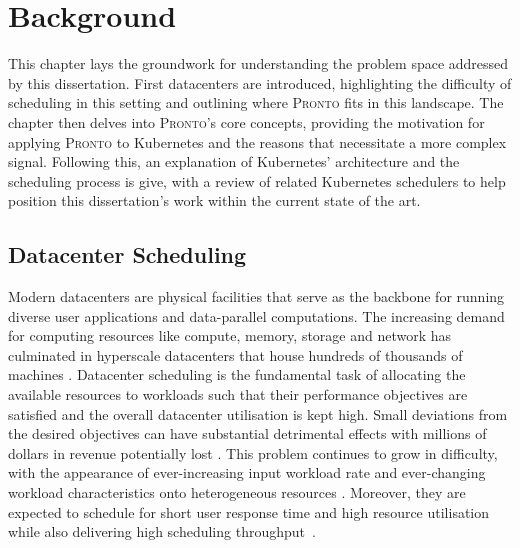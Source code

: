 \chapter{Background}

%
%
This chapter lays the groundwork for understanding the problem space addressed
by this dissertation. First datacenters are introduced, highlighting the
difficulty of scheduling in this setting and outlining where \textsc{Pronto}
fits in this landscape. The chapter then delves into \textsc{Pronto}'s core
concepts, providing the motivation for applying \textsc{Pronto} to Kubernetes
and the reasons that necessitate a more complex signal. Following this, an
explanation of Kubernetes' architecture and the scheduling process is give, with
a review of related Kubernetes schedulers to help position this dissertation's
work within the current state of the art.

\section{Datacenter Scheduling}
\label{sec:background-datacenters}

Modern datacenters are physical facilities that serve as the backbone for
running diverse user applications and data-parallel computations. The increasing
demand for computing resources like compute, memory, storage and network has
culminated in hyperscale datacenters that house hundreds of
thousands of machines \cite{curino2019hydra, tirmazi2020borg}. Datacenter scheduling is the fundamental
task of allocating the available resources to workloads such that their
performance objectives are satisfied and the overall datacenter utilisation is
kept high. Small deviations from the desired objectives can have substantial
detrimental effects with millions of dollars in revenue potentially lost
\cite{barroso2019datacenter}. This problem continues to grow in difficulty, with the
appearance of ever-increasing input workload rate and ever-changing workload
characteristics onto heterogeneous resources \cite{delimitrou2015tarcil, verma2015large}. Moreover, they are
expected to schedule for short user response time and high resource utilisation
while also delivering high scheduling throughput~\cite{curino2019hydra,delimitrou2015tarcil,ousterhout2013sparrow,tirmazi2020borg,verma2015large}.

